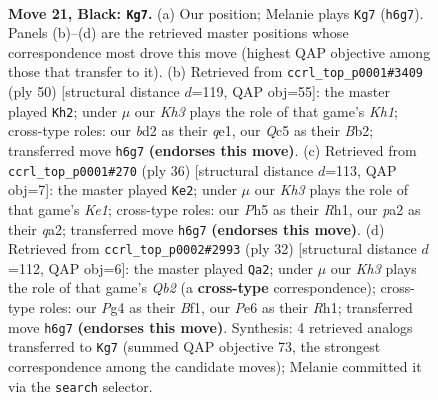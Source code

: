 \documentclass[11pt]{article}
\begin{document}
\clearpage

\begin{figure}[p]\centering
\begin{subfigure}{0.46\textwidth}\centering
\resizebox{\linewidth}{!}{%
\newchessgame
\chessboard[
  setfen={1rb2r2/p1pp1p2/2n1p2k/2q4p/6p1/5NP1/PP1BPP1P/2R1KB1R b - - 1 21},
  showmover=false,
  pgfstyle=straightmove, color=movearrow, markmove={h6-g7}
]}
\caption{}
\end{subfigure}\hfill
\begin{subfigure}{0.46\textwidth}\centering
\resizebox{\linewidth}{!}{%
\newchessgame
\chessboard[
  setfen={2r2bk1/1p3pp1/p2p3p/2nP4/2PQ1N2/1P3R1P/PB4P1/4q2K w - - 0 26},
  showmover=false,
  pgfstyle=straightmove, color=movearrow, markmove={h1-h2}
]}
\caption{}
\end{subfigure}
\\[4pt]
\begin{subfigure}{0.46\textwidth}\centering
\resizebox{\linewidth}{!}{%
\newchessgame
\chessboard[
  setfen={2r2rk1/p3ppbp/3p1np1/3P4/2PQ4/1R2B2P/q2N1PP1/4K2R w K - 0 19},
  showmover=false,
  pgfstyle=straightmove, color=movearrow, markmove={e1-e2}
]}
\caption{}
\end{subfigure}\hfill
\begin{subfigure}{0.46\textwidth}\centering
\resizebox{\linewidth}{!}{%
\newchessgame
\chessboard[
  setfen={2b1k2r/1p1p1ppp/2n5/1p2P3/1bp2P2/1rP3P1/1Q2NP1P/4KB1R w Kk - 1 17},
  showmover=false,
  pgfstyle=straightmove, color=movearrow, markmove={b2-a2}
]}
\caption{}
\end{subfigure}
\caption{\textbf{Move 21, Black: \texttt{Kg7}.} (a) Our position; Melanie plays \texttt{Kg7} (\texttt{h6g7}). Panels (b)--(d) are the retrieved master positions whose correspondence most drove this move (highest QAP objective among those that transfer to it). (b) Retrieved from \texttt{ccrl\_top\_p0001\#3409} (ply 50) [structural distance $d$=119, QAP obj=55]: the master played \texttt{Kh2}; under $\mu$ our \emph{Kh3} plays the role of that game's \emph{Kh1}; cross-type roles: our \emph{b}d2 as their \emph{q}e1, our \emph{Q}c5 as their \emph{B}b2; transferred move \texttt{h6g7} \textbf{(endorses this move)}. (c) Retrieved from \texttt{ccrl\_top\_p0001\#270} (ply 36) [structural distance $d$=113, QAP obj=7]: the master played \texttt{Ke2}; under $\mu$ our \emph{Kh3} plays the role of that game's \emph{Ke1}; cross-type roles: our \emph{P}h5 as their \emph{R}h1, our \emph{p}a2 as their \emph{q}a2; transferred move \texttt{h6g7} \textbf{(endorses this move)}. (d) Retrieved from \texttt{ccrl\_top\_p0002\#2993} (ply 32) [structural distance $d$=112, QAP obj=6]: the master played \texttt{Qa2}; under $\mu$ our \emph{Kh3} plays the role of that game's \emph{Qb2} (a \textbf{cross-type} correspondence); cross-type roles: our \emph{P}g4 as their \emph{B}f1, our \emph{P}e6 as their \emph{R}h1; transferred move \texttt{h6g7} \textbf{(endorses this move)}. Synthesis: 4 retrieved analogs transferred to \texttt{Kg7} (summed QAP objective 73, the strongest correspondence among the candidate moves); Melanie committed it via the \texttt{search} selector.}
\label{fig:thought-m41}
\end{figure}
\end{document}
